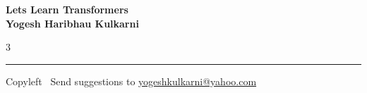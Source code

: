 \documentclass[8pt,landscape]{article}
\begin{document}
\footnotesize


\begin{center}
\Large{\textbf{Lets Learn Transformers\\ Yogesh Haribhau Kulkarni}}
\end{center}

\begin{multicols}{3}

\end{multicols}

\rule{\linewidth}{0.25pt}
\scriptsize
Copyleft \textcopyleft\  Send suggestions to
\href{http://www.yogeshkulkarni.com}{yogeshkulkarni@yahoo.com}
\end{document}
